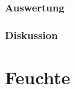 \documentclass[12pt,a4paper]{article}
\begin{document}
\subsubsection*{Auswertung}
\subsubsection*{Diskussion}



\section{Feuchte}
\end{document}
